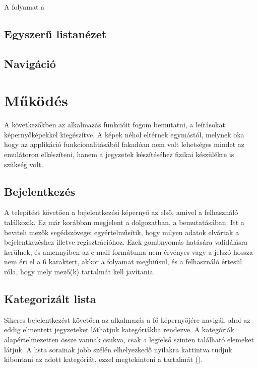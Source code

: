 A folyamat a 

\subsection{Egyszerű listanézet}

\subsection{Navigáció}

\section{Működés}

A következőkben az alkalmazás funkcióit fogom bemutatni, a leírásokat képernyőképekkel kiegészítve. A képek néhol eltérnek egymástól, melynek oka hogy az applikáció funkcionalitásából fakadóan nem volt lehetséges mindet az emulátoron elkészíteni, hanem a jegyzetek készítéséhez fizikai készülékre is szükség volt.

\subsection{Bejelentkezés}
A telepítést követően a bejelentkezési képernyő az első, amivel a felhasználó találkozik. Ez már korábban megjelent a dolgozatban, a  bemutatásában. Itt a beviteli mezők segédszövegei egyértelműsítik, hogy milyen adatok elvártak a bejelentkezéshez illetve regisztrációhoz. Ezek gombnyomás hatására validálásra kerülnek, és amennyiben az e-mail formátuma nem érvényes vagy a jelszó hossza nem éri el a 6 karaktert, akkor a folyamat meghiúsul, és a felhasználó értesül róla, hogy mely mező(k) tartalmát kell javítania. 

\subsection{Kategorizált lista}
Sikeres bejelentkezést követően az alkalmazás a fő képernyőjére navigál, ahol az eddig elmentett jegyzeteket láthatjuk kategóriákba rendezve. A kategóriák alapértelmezetten össze vannak csukva, csak a legfelső szinten található elemeket látjuk. A lista sorainak jobb szélén elhelyezkedő nyilakra kattintva tudjuk kibontani az adott kategóriát, ezzel megtekinteni a tartalmát ().

